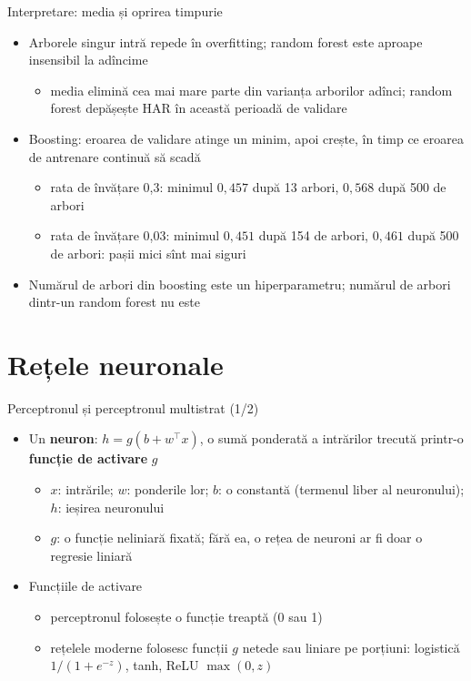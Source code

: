 \begin{frame}{Interpretare: media și oprirea timpurie}
\itemsize{\small}
\begin{itemize}
    \item Arborele singur intră repede în overfitting; random forest este aproape insensibil la adîncime
    \begin{itemize}
        \item media elimină cea mai mare parte din varianța arborilor adînci; random forest depășește HAR în această perioadă de validare
    \end{itemize}
    \item Boosting: eroarea de validare atinge un minim, apoi crește, în timp ce eroarea de antrenare continuă să scadă
    \begin{itemize}
        \item rata de învățare 0,3: minimul $0{,}457$ după 13 arbori, $0{,}568$ după 500 de arbori
        \item rata de învățare 0,03: minimul $0{,}451$ după 154 de arbori, $0{,}461$ după 500 de arbori: pașii mici sînt mai siguri
    \end{itemize}
    \item Numărul de arbori din boosting este un hiperparametru; numărul de arbori dintr-un random forest nu este
\end{itemize}
\end{frame}


\section{Rețele neuronale}

\begin{frame}{Perceptronul și perceptronul multistrat (1/2)}
\itemsize{\small}
\begin{itemize}
    \item Un \textbf{neuron}: $h = g(b + w^\top x)$, o sumă ponderată a intrărilor trecută printr-o \textbf{funcție de activare} $g$
    \begin{itemize}
        \item $x$: intrările; $w$: ponderile lor; $b$: o constantă (termenul liber al neuronului); $h$: ieșirea neuronului
        \item $g$: o funcție neliniară fixată; fără ea, o rețea de neuroni ar fi doar o regresie liniară
    \end{itemize}
    \item Funcțiile de activare
    \begin{itemize}
        \item perceptronul folosește o funcție treaptă (0 sau 1)
        \item rețelele moderne folosesc funcții $g$ netede sau liniare pe porțiuni: logistică $1/(1 + e^{-z})$, tanh, ReLU $\max(0, z)$
    \end{itemize}
\end{itemize}
\end{frame}

